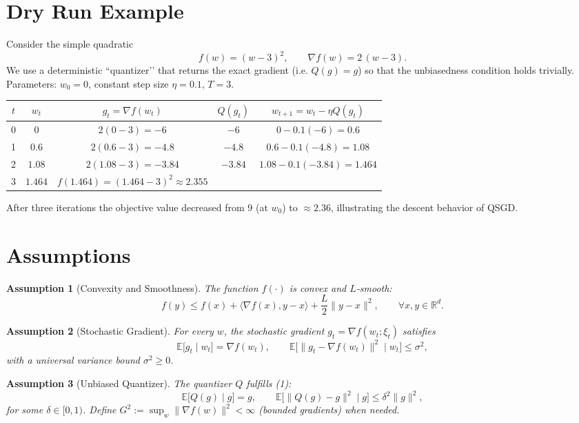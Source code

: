 \documentclass{article}
\newtheorem{assumption}{Assumption}
\newcommand{\E}{\mathbb{E}}
\newcommand{\R}{\mathbb{R}}
\begin{document}
\section*{Dry Run Example}
Consider the simple quadratic
\[
f(w)=(w-3)^{2},\qquad \nabla f(w)=2\,(w-3).
\]
We use a deterministic “quantizer’’ that returns the exact gradient (i.e. $Q(g)=g$) so that the unbiasedness condition holds trivially.  
Parameters: $w_0=0$, constant step size $\eta=0.1$, $T=3$.

\begin{center}
\begin{tabular}{c|c|c|c|c}
$t$ & $w_t$ & $g_t=\nabla f(w_t)$ & $Q(g_t)$ & $w_{t+1}=w_t-\eta Q(g_t)$\\ \hline
0 & $0$ & $2(0-3)=-6$ & $-6$ & $0-0.1(-6)=0.6$\\[2mm]
1 & $0.6$ & $2(0.6-3)=-4.8$ & $-4.8$ & $0.6-0.1(-4.8)=1.08$\\[2mm]
2 & $1.08$ & $2(1.08-3)=-3.84$ & $-3.84$ & $1.08-0.1(-3.84)=1.464$\\[2mm]
3 & $1.464$ & $f(1.464)=(1.464-3)^2\approx2.355$ &  & 
\end{tabular}
\end{center}
After three iterations the objective value decreased from $9$ (at $w_0$) to $\approx2.36$, illustrating the descent behavior of QSGD.

\section*{Assumptions}
\begin{assumption}[Convexity and Smoothness]\label{as:convex}
The function $f(\cdot)$ is convex and $L$‑smooth:
\[
f(y)\le f(x)+\langle\nabla f(x),y-x\rangle+\frac{L}{2}\|y-x\|^{2},\qquad\forall x,y\in\R^{d}.
\]
\end{assumption}

\begin{assumption}[Stochastic Gradient]\label{as:stoch}
For every $w$, the stochastic gradient $g_t=\nabla f(w_t;\xi_t)$ satisfies
\[
\E\big[g_t\mid w_t\big]=\nabla f(w_t),\qquad 
\E\big[\|g_t-\nabla f(w_t)\|^{2}\mid w_t\big]\le \sigma^{2},
\]
with a universal variance bound $\sigma^{2}\ge0$.
\end{assumption}

\begin{assumption}[Unbiased Quantizer]\label{as:quant}
The quantizer $Q$ fulfills (1):
\[
\E\big[Q(g)\mid g\big]=g,\qquad 
\E\big[\|Q(g)-g\|^{2}\mid g\big]\le\delta^{2}\|g\|^{2},
\]
for some $\delta\in[0,1)$.  
Define $G^{2}:=\sup_{w}\|\nabla f(w)\|^{2}<\infty$ (bounded gradients) when needed.
\end{assumption}
\end{document}
